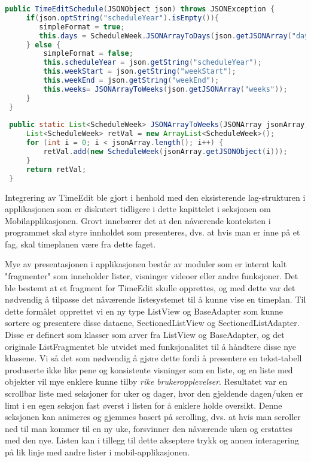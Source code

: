 \documentclass[../main.tex]{subfiles}
\begin{document}
\begin{lstlisting}[language=Java, frame=single, caption={To funksjoner fra Domain-klassen TimeEditSchedule i mobil-applikasjonen}]
public TimeEditSchedule(JSONObject json) throws JSONException {
     if(json.optString("scheduleYear").isEmpty()){
        simpleFormat = true;
        this.days = ScheduleWeek.JSONArrayToDays(json.getJSONArray("days"));
     } else {
         simpleFormat = false;
         this.scheduleYear = json.getString("scheduleYear");
         this.weekStart = json.getString("weekStart");
         this.weekEnd = json.getString("weekEnd");
         this.weeks= JSONArrayToWeeks(json.getJSONArray("weeks"));
     }      
 }
     
 public static List<ScheduleWeek> JSONArrayToWeeks(JSONArray jsonArray) throws JSONException {
     List<ScheduleWeek> retVal = new ArrayList<ScheduleWeek>();        
     for (int i = 0; i < jsonArray.length(); i++) {
         retVal.add(new ScheduleWeek(jsonArray.getJSONObject(i)));
     }        
     return retVal;
 }
 \end{lstlisting}
 
 Integrering av TimeEdit ble gjort i henhold med den eksisterende lag-strukturen i applikasjonen som er diskutert tidligere i dette kapittelet i seksjonen om Mobilapplikasjonen. Grovt innebærer det at den nåværende konteksten i programmet skal styre innholdet som presenteres, dvs. at hvis man er inne på et fag, skal timeplanen være fra dette faget.
 
Mye av presentasjonen i applikasjonen består av moduler som er internt kalt "fragmenter" som inneholder lister, visninger videoer eller andre funksjoner. Det ble bestemt at et fragment for TimeEdit skulle opprettes, og med dette var det nødvendig å tilpasse det nåværende listesystemet til å kunne vise en timeplan.
Til dette formålet opprettet vi en ny type ListView og BaseAdapter som kunne sortere og presentere disse dataene, SectionedListView og SectionedListAdapter.
Disse er definert som klasser som arver fra ListView og BaseAdapter, og det originale ListFragmentet ble utvidet med funksjonalitet til å håndtere disse nye klassene.
Vi så det som nødvendig å gjøre dette fordi å presentere en tekst-tabell produserte ikke like pene og konsistente visninger som en liste, og en liste med objekter vil mye enklere kunne tilby \textit{rike brukeropplevelser}. Resultatet var en scrollbar liste med seksjoner for uker og dager, hvor den gjeldende dagen/uken er limt i en egen seksjon fast øverst i listen for å enklere holde oversikt. Denne seksjonen kan animeres og gjemmes basert på scrolling, dvs. at hvis man scroller ned til man kommer til en ny uke, forsvinner den nåværende uken og erstattes med den nye. 
Listen kan i tillegg til dette akseptere trykk og annen interagering på lik linje med andre lister i mobil-applikasjonen.
\end{document}
